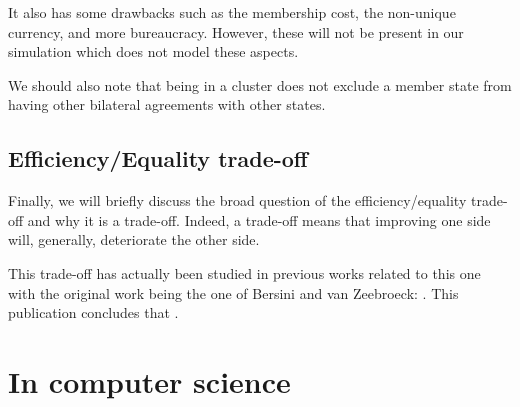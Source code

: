     It also has some drawbacks such as the membership cost, the non-unique currency, and more bureaucracy. However, these will not be present in our simulation which does not model these aspects.
    
    We should also note that being in a cluster does not exclude a member state from having other bilateral agreements with other states.

\subsection{Efficiency/Equality trade-off}
    Finally, we will briefly discuss the broad question of the efficiency/equality trade-off and why it is a trade-off. Indeed, a trade-off means that improving one side will, generally, deteriorate the other side.
    
    This trade-off has actually been studied in previous works related to this one with the original work being the one of Bersini and van Zeebroeck: . This publication concludes that  \cite{bersini}.
    

\section{In computer science}